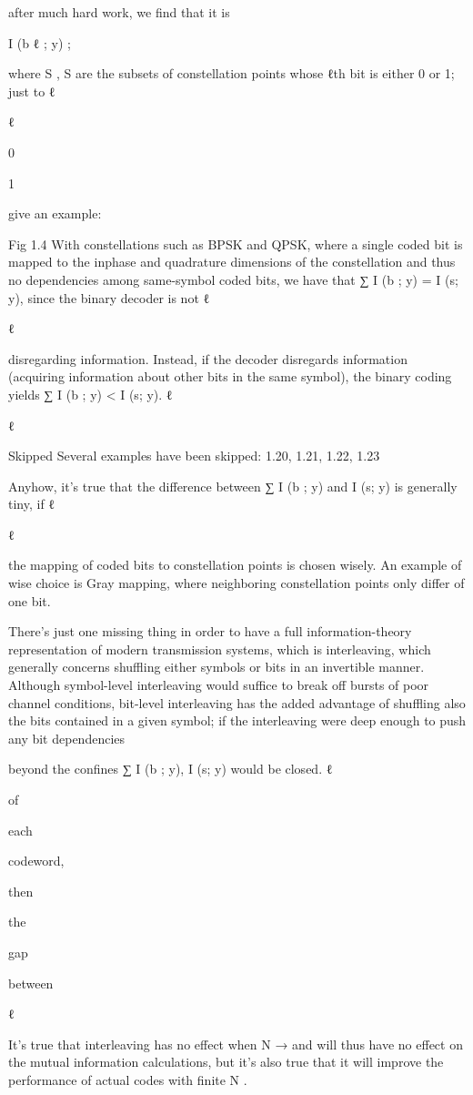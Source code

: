 {after much hard work, we find that it is

I (b ℓ ; y) ;

where S , S are the subsets of constellation points whose ℓth bit is either 0 or 1; just to ℓ

ℓ

0

1

give an example:

Fig 1.4 With constellations such as BPSK and QPSK, where a single coded bit is mapped to the inphase and quadrature dimensions of the constellation and thus no dependencies among same-symbol coded bits, we have that ∑ I (b ; y) = I (s; y), since the binary decoder is not ℓ

ℓ

disregarding information.
Instead, if the decoder disregards information (acquiring information about other bits in the same symbol), the binary coding yields ∑ I (b ; y) < I (s; y).
ℓ

ℓ

Skipped Several examples have been skipped: 1.20, 1.21, 1.22, 1.23

Anyhow, it's true that the difference between ∑ I (b ; y) and I (s; y) is generally tiny, if ℓ

ℓ

the mapping of coded bits to constellation points is chosen wisely. An example of wise choice is Gray mapping, where neighboring constellation points only differ of one bit.

There's just one missing thing in order to have a full information-theory representation of modern transmission systems, which is interleaving, which generally concerns shuffling either symbols or bits in an invertible manner.
Although symbol-level interleaving would suffice to break off bursts of poor channel conditions, bit-level interleaving has the added advantage of shuffling also the bits contained in a given symbol; if the interleaving were deep enough to push any bit dependencies

beyond the confines
∑ I (b ; y), I (s; y) would be closed.
ℓ

of

each

codeword,

then

the

gap

between

ℓ

It's true that interleaving has no effect when N → \infty and will thus have no effect on the mutual information calculations, but it's also true that it will improve the performance of actual codes with finite N .

}
